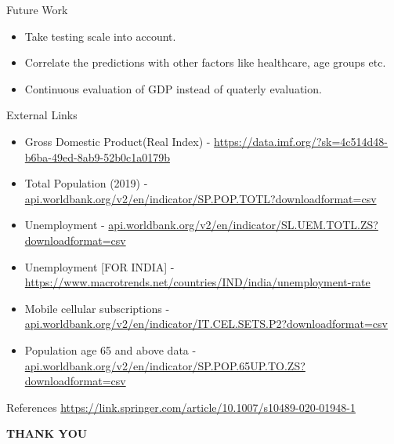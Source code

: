 \documentclass[11pt]{beamer}
\begin{document}
\begin{frame}{Future Work}
\begin{itemize}
    \item Take testing scale into account.
    \item Correlate the predictions with other factors like healthcare, age groups etc.
    \item Continuous evaluation of GDP instead of quaterly evaluation.
\end{itemize}

\end{frame}

\begin{frame}{External Links}
\begin{itemize}
\item Gross Domestic Product(Real Index) - \url{https://data.imf.org/?sk=4c514d48-b6ba-49ed-8ab9-52b0c1a0179b}
\item Total Population (2019) - \url{api.worldbank.org/v2/en/indicator/SP.POP.TOTL?downloadformat=csv}
\item Unemployment - \url{api.worldbank.org/v2/en/indicator/SL.UEM.TOTL.ZS?downloadformat=csv}
\item Unemployment [FOR INDIA] - \url{https://www.macrotrends.net/countries/IND/india/unemployment-rate}
\item Mobile cellular subscriptions - \url{api.worldbank.org/v2/en/indicator/IT.CEL.SETS.P2?downloadformat=csv}
\item Population age 65 and above data - \url{api.worldbank.org/v2/en/indicator/SP.POP.65UP.TO.ZS?downloadformat=csv}
\end{itemize}
\end{frame}

\begin{frame}{References}
    \url{https://link.springer.com/article/10.1007/s10489-020-01948-1}
\end{frame}
\begin{frame}
\center \textbf{THANK YOU}
    
\end{frame}
\end{document}
